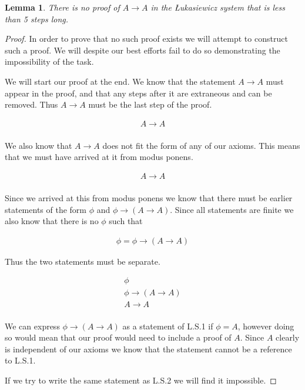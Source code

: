 \documentclass{article}
\newtheorem{lem}{Lemma}
\begin{document}
\begin{lem}
There is no proof of $A \rightarrow A$ in the \L ukasiewicz system that is less than 5 steps long.
\end{lem}
\begin{proof}
In order to prove that no such proof exists we will attempt to construct such a proof.
We will despite our best efforts fail to do so demonstrating the impossibility of the task.

We will start our proof at the end.
We know that the statement $A \rightarrow A$ must appear in the proof,
and that any steps after it are extraneous and can be removed.
Thus $A \rightarrow A$ must be the last step of the proof.

\begin{align*}
A \rightarrow A \\
\end{align*}

We also know that $A \rightarrow A$ does not fit the form of any of our axioms.
This means that we must have arrived at it from modus ponens.

\begin{align*}
A \rightarrow A \tag*{Modus Ponens}\\
\end{align*}

Since we arrived at this from modus ponens we know that there must be earlier statements of the form $\phi$ and $\phi \rightarrow (A \rightarrow A)$.
Since all statements are finite we also know that there is no $\phi$ such that

\begin{align*}
\phi = \phi \rightarrow (A \rightarrow A)
\end{align*}

Thus the two statements must be separate.

\begin{gather*}
\phi \\
\phi \rightarrow (A \rightarrow A) \\
A \rightarrow A \tag*{Modus Ponens}\\
\end{gather*}

We can express $\phi \rightarrow (A \rightarrow A)$ as a statement of L.S.1 if $\phi = A$,
however doing so would mean that our proof would need to include a proof of $A$.
Since $A$ clearly is independent of our axioms we know that the statement cannot be a reference to L.S.1.

If we try to write the same statement as L.S.2 we will find it impossible.


\end{proof}
\end{document}
